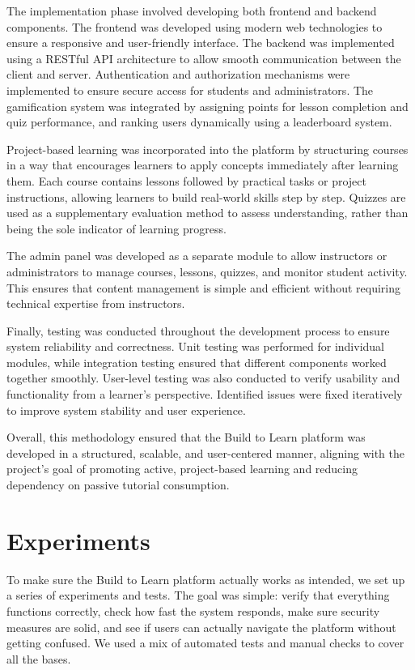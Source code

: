 \documentclass[final,3p,times,twocolumn]{elsarticle}
\begin{document}
The implementation phase involved developing both frontend and backend components. The frontend was developed using modern web technologies to ensure a responsive and user-friendly interface. The backend was implemented using a RESTful API architecture to allow smooth communication between the client and server. Authentication and authorization mechanisms were implemented to ensure secure access for students and administrators. The gamification system was integrated by assigning points for lesson completion and quiz performance, and ranking users dynamically using a leaderboard system.

Project-based learning was incorporated into the platform by structuring courses in a way that encourages learners to apply concepts immediately after learning them. Each course contains lessons followed by practical tasks or project instructions, allowing learners to build real-world skills step by step. Quizzes are used as a supplementary evaluation method to assess understanding, rather than being the sole indicator of learning progress.

The admin panel was developed as a separate module to allow instructors or administrators to manage courses, lessons, quizzes, and monitor student activity. This ensures that content management is simple and efficient without requiring technical expertise from instructors.

Finally, testing was conducted throughout the development process to ensure system reliability and correctness. Unit testing was performed for individual modules, while integration testing ensured that different components worked together smoothly. User-level testing was also conducted to verify usability and functionality from a learner’s perspective. Identified issues were fixed iteratively to improve system stability and user experience.

Overall, this methodology ensured that the Build to Learn platform was developed in a structured, scalable, and user-centered manner, aligning with the project’s goal of promoting active, project-based learning and reducing dependency on passive tutorial consumption.


\section{Experiments}

To make sure the Build to Learn platform actually works as intended, we set up a series of experiments and tests. The goal was simple: verify that everything functions correctly, check how fast the system responds, make sure security measures are solid, and see if users can actually navigate the platform without getting confused. We used a mix of automated tests and manual checks to cover all the bases.
\end{document}
